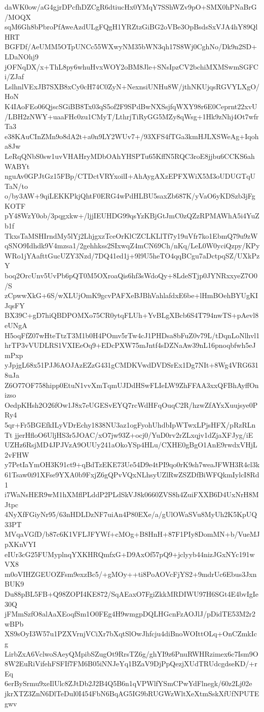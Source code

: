daWK0ow/aG4gjrDPcfhDZCgR6dtiucHx0YMqY7SShWZv9pO+SMX0hPNaBrG/MOQX
sqM6Gh8bPbroPfAweAzdULgFQgH1YRZtzGiBG2oVBe3OpBsdsSxVJA4hY89QlHRT
BGFDf/AeUMM5OTpUNCc55WXwyNM35bWN3qh17S8Wj0CghNo/Dk9n2SD+LDaNOhj9
jOFNqDX/x+ThL8py6whuHvxWOY2oBM8Jle+SNsIpzCV2bchiMXMSwmSGFCi/ZJaf
LslhnlVExJB7SXB8xCy0cH74C0ZyN+NexnsiUNHu8W/jthNKUjqsRGVYLXgO/HoN
K4IAoFEo06QjscSGiBB8Tx03qS5of2F9SPdBwNXSsjfqWXY98r6E0Ceprnt22xvU
/LBH2zNWY+uaaFHc0zu1CMyT/LthrjTiRyGG5MZy8qWsg+1Hk9zNhj4Ot7wfrTa3
e38KAuCInZMn9o8dA2t+a0n9LY2WUv7+/93XFS4fTGa3kmHJLXSWeAg+Iqoha8Jw
LeRqQNbS0sw1uvVHAHryMDbOAhYHSPTu65KffN5RQC3roE8jjbu6CCKS6ahWABYt
nguAv0GPJtGz15FBp/CTDctVRYxoilI+AhAygAXzEPFXWiX5M3oUDUGTqUTaN/to
o/by3AW+9qiLEKKPkjQhtF0ERG4wPdHLBU5saxZb687K/yVaO6yKDSzb3jFgKOTF
pY48WzY0ob/3pqgxkw+/ljjIEUHDG99qsYzKBjGtJmC0zQZzRPMAWhA5i4YuZb1f
TkxsTaMSHIrndMy5lYj2LhjgxzTceOrKlCZCLKLlTf7y19uVfr7ko1EbmQ79u9zW
qSNO9Idhdk9V4mzsa1/2gehhkss2SIxwqZ4mCN69Ch/nKq/LeL0W0yciQzpy/KPy
WRo1jYAafttGucUZY3Nzd/7DQ41ed1j+9l9U5heTO4qqBCgu7aDctpqSZ/UXkPzY
boq2OrcUnv5UvPb6pQT0M5OXroaQis6hf3sWdoQy+8LdeSTjp0JYNRxxyeZ7O0/S
zCpwwXkG+6S/wXLUjOmK9gcvPAFXeBJBhVahlafdxE6be+lHmBOehBYUgKIJqsFY
BX39C+gD7hiQBDPOMXo75CR0ytqFLUh+YvBLgXBcb6S4T794nwTS+pAevl8eUNgA
H5oqFfZ07wHteTtzT3M1b0H4POmv5rTw4cJ1PHDsa8bFuZ0v79L/tDqnLoNlhvl1
hrTP3vVUDLRS1VXIEeOq9+EDcPXW75mJntf4sDZNaAw39nL16pnoqbfwh5eJmPxp
yJpjgL68x51PJJ6AOJAzEZzG431gCMDKVwdDVDSrEx1Dg7NIt+8Wg4VRG6318uJa
Z6O77OF758hipp0EtuN1vvXmTqmUJDdHSwFLIeLW9ZhFFAA3xxQFBhAyffOnizso
OedpKHsh2O26fOw1J8x7eUGESvEYQ7rcWdHFqOuqC2R/hzwZfAYxXuujsye0PRy4
5qr+Fr5BGEfkILyVDrEchy1838NU3az1ogFyohUhdbIpWTwxLPjsHFX/pRzRLnTt
jjerHfloO6UljHS3r5JOAC/xO7jw93Z+ocj0/YuD0rv2rZLxqjv1dZjaXFJyg/iE
UZHz6RsjMD4JPJVzA9OUUy241aOkoYSp4HLu/CXHE0gBgO1AnE9rwdxVHjL2vFHW
y7PetIaYmOH3K91ct9+qBdTzEKE73Ue54D9e4tPI9qo0rK9sh7weaJFWH3R4cl3k
61Tsaw0i91XFse9YXA0b9FxjZ6gQPvVQxNLhsyUZlRwZSZDfBiWFQkmIylcI8Rd1
i7WaNsHER9wM1hXMflPLddP2PLdSkVJ8k0660ZVS8h4ZuiFXXB6D4UxNrH8MJtpc
4NyXfFGiyNr95/63nHDLDzNF7uiAn4P80EXe/a/gUlOWaSVu8MyUh2K5KpUQ33PT
MVqaVGfD/b87c6K1VFLJFYWf+cMOg+B8HnH+87F1PIy8DomMN+b/VueMJpXKnVYI
eIUr3cG25FUMyplnqYXKHRQmfxG+D9AxOf57pQ9+jclyyb44nizJGxNYc191wVX8
m0oVIHZGEUOZFsm9exzBc5/+gMOy++ti8PoAOVcFjYS2+9mdrUc6Ebus3JxnBUK9
Du88pBL5FB+Q98ZOPI4KE872/SqAEaxO7FgiZkkMRDIWU97H6SGt4E4bvIgIe30Q
jFMmSzfO8alAaXEoqfSm1O0FEg4H9wmgpDQLHGcnFzAOJlJ/pDidTE53M2r2wBPb
XS9sOyI3W57u1PZXVrnjVCiXr7bXqtSlOwJhfcju4diBnoWOIttOLq+OnCZmkIcg
LirbZxA6VclwoSAeyQMpibSZugOt9RrsTZ6g/ghYI9z6PnuRWHRzimex6c7Ism9O
8W2EuRiVifehFSFIf7FM6B05iNNJeYq1BZaV9DjPpQezjXUdTRUdcgdseKD/+rEq
6erBySrmu9xeIlUlc8ZJtDb2J2B4Q5B6n1qVPWlfYSmCPwYdFlnegk/60z2Lj02e
jkrXTZ3ZnN6DlTeDul0I454FbN6BqAG5IG9bRUGWzWltXeXtmSskXfUfNPUTEgwv
